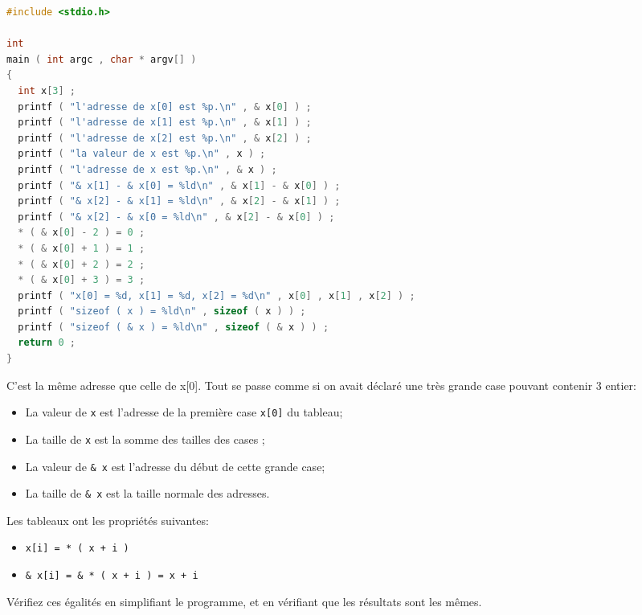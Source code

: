 \begin{solution}
  \begin{lstlisting}[language=C]
#include <stdio.h>

int
main ( int argc , char * argv[] )
{
  int x[3] ;
  printf ( "l'adresse de x[0] est %p.\n" , & x[0] ) ;
  printf ( "l'adresse de x[1] est %p.\n" , & x[1] ) ;
  printf ( "l'adresse de x[2] est %p.\n" , & x[2] ) ;
  printf ( "la valeur de x est %p.\n" , x ) ;
  printf ( "l'adresse de x est %p.\n" , & x ) ;
  printf ( "& x[1] - & x[0] = %ld\n" , & x[1] - & x[0] ) ;
  printf ( "& x[2] - & x[1] = %ld\n" , & x[2] - & x[1] ) ;
  printf ( "& x[2] - & x[0 = %ld\n" , & x[2] - & x[0] ) ;
  * ( & x[0] - 2 ) = 0 ;
  * ( & x[0] + 1 ) = 1 ;
  * ( & x[0] + 2 ) = 2 ;
  * ( & x[0] + 3 ) = 3 ;
  printf ( "x[0] = %d, x[1] = %d, x[2] = %d\n" , x[0] , x[1] , x[2] ) ;
  printf ( "sizeof ( x ) = %ld\n" , sizeof ( x ) ) ;
  printf ( "sizeof ( & x ) = %ld\n" , sizeof ( & x ) ) ;
  return 0 ;
}    
  \end{lstlisting}


  C'est la même adresse que celle de x[0]. Tout se passe comme si on
  avait déclaré une très grande case pouvant contenir 3 entier:
  \begin{itemize}
  \item La valeur de \texttt{x} est l'adresse de la première case
    \texttt{x[0]} du tableau;
  \item La taille de \texttt{x} est la somme des tailles des cases ;
  \item La valeur de \texttt{\& x} est l'adresse du début de cette grande case;
  \item La taille de \texttt{\& x} est la taille normale des adresses.
  \end{itemize}
\end{solution}

\begin{fminipage}{0.9\textwidth}
  Les tableaux ont les propriétés suivantes:
  \begin{itemize}
  \item \texttt{x[i] = * ( x + i )}
  \item \texttt{\& x[i] = \& * ( x + i ) = x + i}
  \end{itemize}
\end{fminipage}

\question Vérifiez ces égalités en simplifiant le programme, et en
vérifiant que les résultats sont les mêmes.


